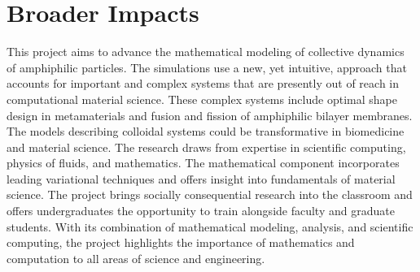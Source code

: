 \section{Broader Impacts}
\label{sec:BroaderImpacts}
This project aims to advance the mathematical modeling of collective dynamics of amphiphilic particles. The simulations use a new, yet intuitive, approach that accounts for important and complex systems that are presently out of reach in computational material science. These complex systems include optimal shape design in metamaterials and fusion and fission of amphiphilic bilayer membranes. The models describing colloidal systems could be transformative in biomedicine and material science. The research draws from expertise in scientific computing, physics of fluids, and mathematics. The mathematical component incorporates leading variational techniques and offers insight into fundamentals of material science. The project brings socially consequential research into the classroom and offers 
undergraduates the opportunity to train alongside faculty and graduate students. With its combination of mathematical modeling, analysis, and scientific computing, the project highlights the importance of mathematics and computation to all areas of science and engineering.


